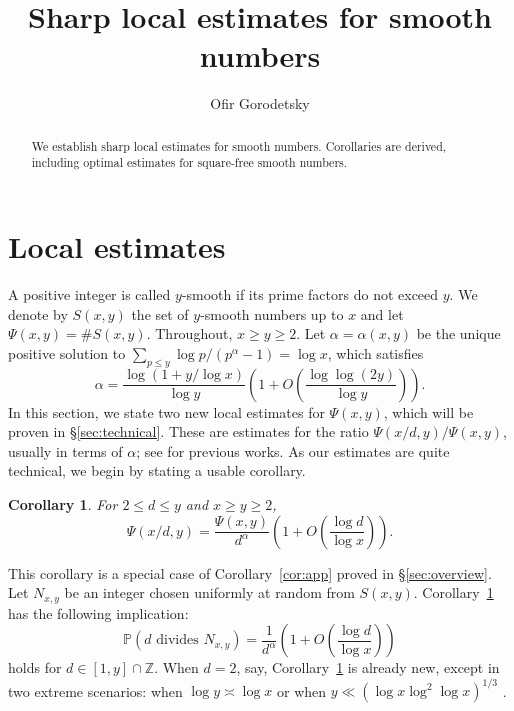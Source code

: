 \documentclass{amsart}
\author{Ofir Gorodetsky}
\title{Sharp local estimates for smooth numbers}
\theoremstyle{plain}
\newtheorem{cor}[thm]{Corollary}
\theoremstyle{remark}
\newcommand{\PP}{\mathbb{P}}
\newcommand{\ZZ}{\mathbb{Z}}
\begin{document}
\begin{abstract}
	We establish sharp local estimates for smooth numbers. Corollaries are derived, including optimal estimates for square-free smooth numbers.
\end{abstract}

\maketitle

\section{Local estimates}
A positive integer is called $y$-smooth if its prime factors do not exceed $y$. We denote by $S(x,y)$ the set of $y$-smooth numbers up to $x$ and let $\Psi(x,y)=\#S(x,y)$. Throughout, $x \ge y \ge 2$. Let $\alpha=\alpha(x,y)$ be the unique positive solution to $\sum_{p \le y}\log p/(p^{\alpha}-1)=\log x$, which satisfies \cite[Thm.~2]{HildebrandTenenbaum1986}
\begin{equation}\label{eq:alphasize} 	\alpha = \frac{\log(1+y/\log x)}{\log y} \left(1+O\left(\frac{\log \log (2y)}{\log y}\right)\right).
\end{equation}
In this section, we state two new local estimates for $\Psi(x,y)$, which will be proven in \S\ref{sec:technical}. These are estimates for the ratio $\Psi(x/d,y)/\Psi(x,y)$, usually in terms of $\alpha$; see \cite{Hensley1986,Hildebrand1986local,HildebrandTenenbaum1986,Ivic,DLBT20052,DeLa2017} for previous works. As our estimates are quite technical, we begin by stating a usable corollary.
\begin{cor}\label{cor:usable}
For $2 \le d \le y$ and $x \ge y \ge 2$,
\begin{equation}\label{eq:state2more4} \Psi(x/d,y)=\frac{\Psi(x,y)}{d^{\alpha}} \left(1+O\left( \frac{\log d}{\log x} \right)\right).
\end{equation}
\end{cor}
This corollary is a special case of Corollary~\ref{cor:app} proved in \S\ref{sec:overview}. Let $N_{x,y}$ be an integer chosen uniformly at random from $S(x,y)$.  Corollary~\ref{cor:usable} has the following implication:
\begin{equation}\label{eq:imp}
\PP(d \text{ divides }N_{x,y}) =\frac{1}{d^{\alpha}}\left( 1+ O\left(\frac{\log d}{\log x}\right)\right)
\end{equation}
holds for $d \in [1,y]\cap \ZZ$. When $d=2$, say, Corollary~\ref{cor:usable} is already new, except in two extreme scenarios: when $\log y \asymp \log x$ \cite[Thm.~2.4]{DLBT20052} or when $y\ll (\log x \log^2 \log x)^{1/3}$ \cite[Cor.~3.2]{DeLa2017}. 
\end{document}
